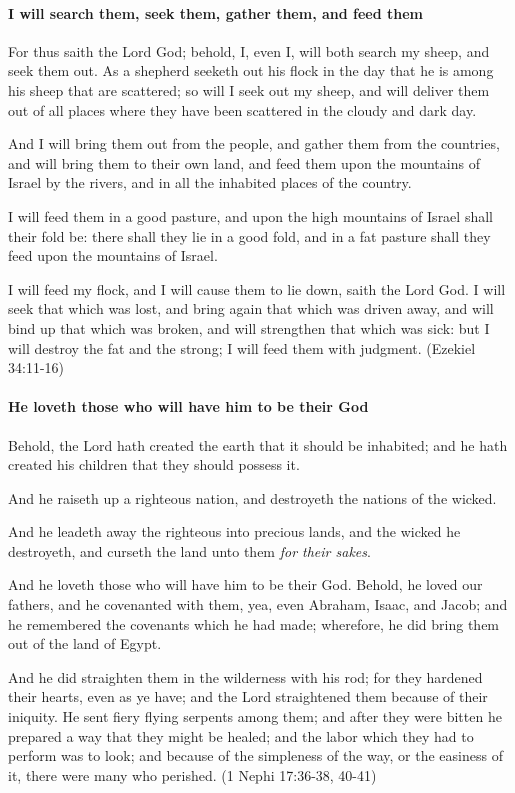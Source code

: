 \paragraph{I will search them, seek them, gather them, and feed them}
For thus saith the Lord God; behold, I, even I, will both search my sheep, and seek them out. As a shepherd seeketh out his flock in the day that he is among his sheep that are scattered; so will I seek out my sheep, and will deliver them out of all places where they have been scattered in the cloudy and dark day.

And I will bring them out from the people, and gather them from the countries, and will bring them to their own land, and feed them upon the mountains of Israel by the rivers, and in all the inhabited places of the country. 

I will feed them in a good pasture, and upon the high mountains of Israel shall their fold be: there shall they lie in a good fold, and in a fat pasture shall they feed upon the mountains of Israel.

I will feed my flock, and I will cause them to lie down, saith the Lord God. I will seek that which was lost, and bring again that which was driven away, and will bind up that which was broken, and will strengthen that which was sick: but I will destroy the fat and the strong; I will feed them with judgment. (Ezekiel 34:11-16)

\paragraph{He loveth those who will have him to be their God}
Behold, the Lord hath created the earth that it should be inhabited; and he hath created his children that they should possess it.

And he raiseth up a righteous nation, and destroyeth the nations of the wicked.

And he leadeth away the righteous into precious lands, and the wicked he destroyeth, and curseth the land unto them \textit{for their sakes}.

And he loveth those who will have him to be their God. Behold, he loved our fathers, and he covenanted with them, yea, even Abraham, Isaac, and Jacob; and he remembered the covenants which he had made; wherefore, he did bring them out of the land of Egypt.

And he did straighten them in the wilderness with his rod; for they hardened their hearts, even as ye have; and the Lord straightened them because of their iniquity. He sent fiery flying serpents among them; and after they were bitten he prepared a way that they might be healed; and the labor which they had to perform was to look; and because of the simpleness of the way, or the easiness of it, there were many who perished. (1 Nephi 17:36-38, 40-41)

